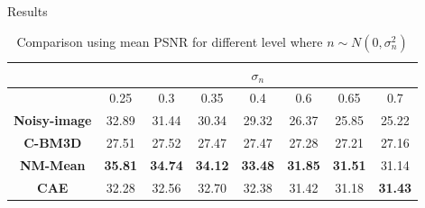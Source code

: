 \documentclass{libs/ufc_format}
\begin{document}
\begin{frame}{Results}
\begin{itemize}
{{                  \begin{table}[h]
                      \centering
                      \caption{Comparison using mean PSNR for different level where $n \sim N(0, \sigma^2_n)$}
                      \label{psnrcom}
                      \begin{adjustbox}{width=0.8\textwidth}
                          \begin{tabular}{|c|c|c|c|c|c|c|c|}
                              \hline
                                                   & \multicolumn{7}{c|}{\textbf{$\sigma_n$}}                                                                                                       \\ \hline
                                                   & 0.25                                     & 0.3            & 0.35           & 0.4            & 0.6            & 0.65           & 0.7            \\ \hline
                              \textbf{Noisy-image} & 32.89                                    & 31.44          & 30.34          & 29.32          & 26.37          & 25.85          & 25.22          \\ \hline
                              \textbf{C-BM3D}      & 27.51                                    & 27.52          & 27.47          & 27.47          & 27.28          & 27.21          & 27.16          \\ \hline
                              \textbf{NM-Mean}     & \textbf{35.81}                           & \textbf{34.74} & \textbf{34.12} & \textbf{33.48} & \textbf{31.85} & \textbf{31.51} & 31.14          \\ \hline
                              \textbf{CAE}         & 32.28                                    & 32.56          & 32.70          & 32.38          & 31.42          & 31.18          & \textbf{31.43} \\ \hline
                          \end{tabular}
                      \end{adjustbox}
                  \end{table}
              }}


    \end{itemize}
\end{frame}
\end{document}
